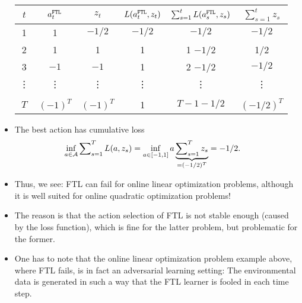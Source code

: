 \documentclass[11pt,compress,t,notes=noshow, xcolor=table]{beamer}
\begin{document}
\begin{vbframe}
\begin{itemize}
		\begin{centering}
			 \begin{tabular}{c|c|c|c|c|c} 
				$t$ & $a_t^{\texttt{FTL}}$ & $z_t$ & $L(a_t^{\texttt{FTL}},z_t)$  &  $\sum_{s=1}^t L(a_s^{\texttt{FTL}},z_s)$ & $\sum_{s=1}^t z_s $ \\
				\hline
				1 & 1 & $-1/2$ & $-1/2$ & $-1/2$ & $-1/2$  \\
				\hline
				2 & 1 & 1 & 1 & 1 $- 1/2$ & 1/2 \\
				\hline
				3 & $-1$ & $-1$ & 1 & 2 $- 1/2$ & $-1/2$ \\
				\hline
				\vdots & \vdots & \vdots & \vdots & \vdots & \vdots \\
				\hline 
				& & & & &\\
				$T$ & $(-1)^T$ & $(-1)^T$ & 1 & $T-1-1/2$ & $(-1/2)^{T}$ \\
			\end{tabular}
		\end{centering}
%		 
		\item The best action has cumulative loss 		
%		
		\begin{align*}
			\inf_{a \in \mathcal{A}} \sum\nolimits_{s=1}^T L(a,z_s) &= \inf_{a \in [-1,1]} a \underbrace{\sum\nolimits_{s=1}^T  z_s}_{=(-1/2)^{T}} = -1/2.
		\end{align*}
		\small
%		
		 \item Thus, we see: FTL can fail for {\color{red} online linear optimization problems}, although it is well suited for {\color{blue}  online quadratic optimization problems}!
		 \item The reason is that the action selection of FTL is not stable enough (caused by the loss function), which is fine for {\color{blue} the latter problem}, but problematic for {\color{red} the former}.
		\item One has to note that the online linear optimization problem example above, where FTL fails, is in fact an adversarial learning setting: The environmental data is generated in such a way that the FTL learner is fooled in each time step.
%		
	\end{itemize}
\end{vbframe}
\end{document}
